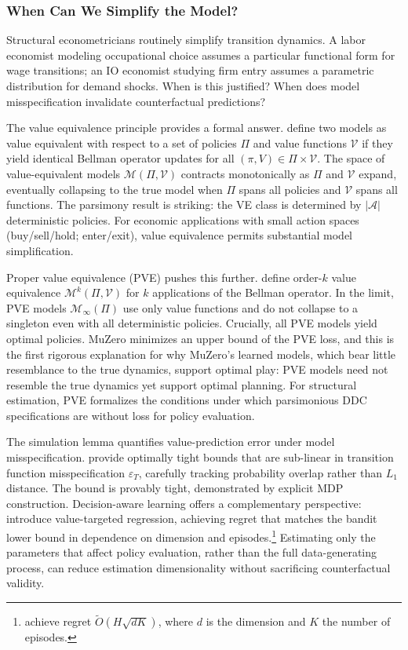 \subsubsection{When Can We Simplify the Model?}

Structural econometricians routinely simplify transition dynamics. A labor economist modeling occupational choice assumes a particular functional form for wage transitions; an IO economist studying firm entry assumes a parametric distribution for demand shocks. When is this justified? When does model misspecification invalidate counterfactual predictions?

The value equivalence principle provides a formal answer. \citet{grimm2020value} define two models as value equivalent with respect to a set of policies $\Pi$ and value functions $\mathcal{V}$ if they yield identical Bellman operator updates for all $(\pi, V) \in \Pi \times \mathcal{V}$. The space of value-equivalent models $\mathcal{M}(\Pi, \mathcal{V})$ contracts monotonically as $\Pi$ and $\mathcal{V}$ expand, eventually collapsing to the true model when $\Pi$ spans all policies and $\mathcal{V}$ spans all functions. The parsimony result is striking: the VE class is determined by $|\mathcal{A}|$ deterministic policies. For economic applications with small action spaces (buy/sell/hold; enter/exit), value equivalence permits substantial model simplification.

Proper value equivalence (PVE) pushes this further. \citet{grimm2021proper} define order-$k$ value equivalence $\mathcal{M}^k(\Pi, \mathcal{V})$ for $k$ applications of the Bellman operator. In the limit, PVE models $\mathcal{M}_\infty(\Pi)$ use only value functions and do not collapse to a singleton even with all deterministic policies. Crucially, all PVE models yield optimal policies. MuZero \citep{Schrittwieser2020} minimizes an upper bound of the PVE loss, and this is the first rigorous explanation for why MuZero's learned models, which bear little resemblance to the true dynamics, support optimal play: PVE models need not resemble the true dynamics yet support optimal planning. For structural estimation, PVE formalizes the conditions under which parsimonious DDC specifications are without loss for policy evaluation.

The simulation lemma quantifies value-prediction error under model misspecification. \citet{lobel2024simulation} provide optimally tight bounds that are sub-linear in transition function misspecification $\varepsilon_T$, carefully tracking probability overlap rather than $L_1$ distance. The bound is provably tight, demonstrated by explicit MDP construction. Decision-aware learning offers a complementary perspective: \citet{ayoub2020value} introduce value-targeted regression, achieving regret that matches the bandit lower bound in dependence on dimension and episodes.\footnote{\citet{ayoub2020value} achieve regret $\tilde{O}(H\sqrt{dK})$, where $d$ is the dimension and $K$ the number of episodes.} Estimating only the parameters that affect policy evaluation, rather than the full data-generating process, can reduce estimation dimensionality without sacrificing counterfactual validity.

